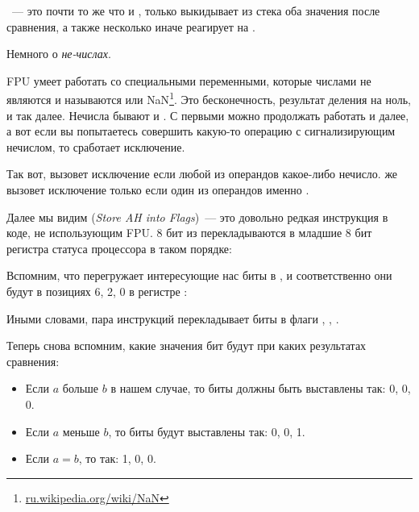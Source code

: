


\FUCOMPP~--- это почти то же что и \FCOM, только выкидывает из стека оба значения после сравнения, 
а также несколько иначе реагирует на .

Немного о \emph{не-числах}.

\newcommand{\NANFN}{\footnote{\href{http://go.yurichev.com/17129}{ru.wikipedia.org/wiki/NaN}}}

FPU умеет работать со специальными переменными, которые числами не являются и называются  или 
\gls{NaN}\NANFN. 
Это бесконечность, результат деления на ноль, и так далее. Нечисла бывают  и . 
С первыми можно продолжать работать и далее, а вот если вы попытаетесь совершить какую-то операцию 
с сигнализирующим нечислом, то сработает исключение.

Так вот, \FCOM вызовет исключение если любой из операндов какое-либо нечисло.
\FUCOM же вызовет исключение только если один из операндов именно .

\label{SAHF}
Далее мы видим \SAHF (\emph{Store AH into Flags})~--- это довольно редкая инструкция в коде, не использующим FPU. 
8 бит из \AH перекладываются в младшие 8 бит регистра статуса процессора в таком порядке:



Вспомним, что \FNSTSW перегружает интересующие нас биты \CThreeBits в \AH, 
и соответственно они будут в позициях 6, 2, 0 в регистре \AH:



Иными словами, пара инструкций  перекладывает биты \CThreeBits в флаги \ZF, \PF, \CF.

Теперь снова вспомним, какие значения бит \CThreeBits будут при каких результатах сравнения:

\begin{itemize}
\item Если $a$ больше $b$ в нашем случае, то биты \CThreeBits должны быть выставлены так: 0, 0, 0.
\item Если $a$ меньше $b$, то биты будут выставлены так: 0, 0, 1.
\item Если $a=b$, то так: 1, 0, 0.
\end{itemize}


